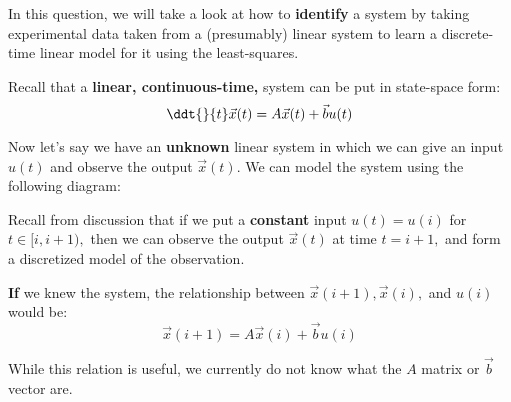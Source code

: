 

In this question, we will take a look at how to \textbf{identify} a system by taking experimental data taken from a (presumably) linear system to learn a discrete-time linear model for it using the least-squares.

Recall that a \textbf{linear, continuous-time,} system can be put in state-space form:
\begin{equation}
\ddt{}{t} \vec{x}(t) = A \vec{x}(t) + \vec{b} u(t)
\end{equation}

Now let's say we have an \textbf{unknown} linear system in which we can give an input $u(t)$ and observe the output $\vec{x}(t).$ We can model the system using the following diagram:
\begin{center}
\end{center}

Recall from discussion that if we put a \textbf{constant} input $u(t) = u(i)$ for $t \in [i, i+1),$ then we can observe the output $\vec{x}(t)$ at time $t = i + 1,$ and form a discretized model of the observation. 

\begin{center}
\end{center}

\textbf{If} we knew the system, the relationship between $\vec{x}(i+1), \vec{x}(i),$ and $u(i)$ would be:
\begin{equation}
\vec{x}(i + 1) = A \vec{x}(i) + \vec{b} u(i)
\end{equation}

While this relation is useful, we currently do not know what the $A$ matrix or $\vec{b}$ vector are.

